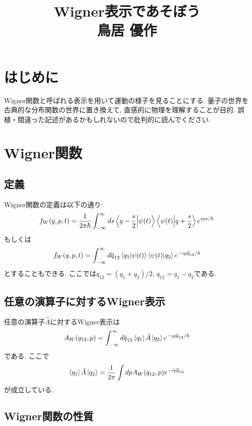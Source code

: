 \documentclass[10.5pt,a4paper]{jsarticle}
\title{
  \Huge Wigner表示であそぼう\\
  \Large 鳥居 優作
}
\begin{document}
\maketitle
\thispagestyle{empty}
\tableofcontents
\section{はじめに}
Wigner関数と呼ばれる表示を用いて運動の様子を見ることにする. 量子の世界を古典的な分布関数の世界に置き換えて, 直感的に物理を理解することが目的. 誤植・間違った記述があるかもしれないので批判的に読んでください. 
\section{Wigner関数}
\subsection{定義}
Wigner関数の定義は以下の通り:
\begin{eqnarray}
  f_W(q, p, t) = \frac{1}{2\pi\hbar}\int_{-\infty}^{\infty} ds \bra{q-\frac{s}{2}}\ket{\psi(t)}\bra{\psi(t)}\ket{q+\frac{s}{2}}e^{ips/\hbar}\label{wigner1}
\end{eqnarray}
もしくは
\begin{eqnarray}
  f_W(q, p, t) = \int_{-\infty}^{\infty} d\overline{q}_{12} \bra{q_1}\ket{\psi(t)}\bra{\psi(t)}\ket{q_2}e^{-ip\overline{q}_{12}/\hbar}\label{wigner2}
\end{eqnarray}
とすることもできる. ここでは$q_{12} = (q_1 + q_2)/2$, $\overline{q}_{12} = q_1 - q_2$である.

\subsection{任意の演算子に対するWigner表示}
任意の演算子$\hat{A}$に対するWigner表示は
\begin{eqnarray}
  A_W(q_{12}, p) = \int_{-\infty}^{\infty} d\overline{q}_{12} \bra{q_1}\hat{A}\ket{q_2}e^{-ip\overline{q}_{12}/\hbar}\label{wigner_op}
\end{eqnarray}
である. ここで
\begin{eqnarray}
  \bra{q_1}\hat{A}\ket{q_2} = \frac{1}{2\pi}\int dp A_W(q_{12}, p)e^{-ip\overline{q}_{12}}\label{wigner_formula}
\end{eqnarray}
が成立している.
\subsection{Wigner関数の性質}
\end{document}
